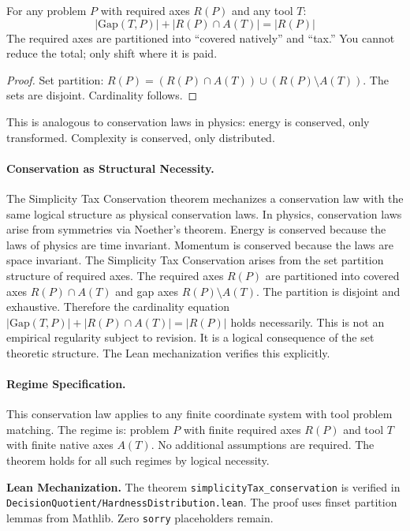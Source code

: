 \begin{theorem}\label{thm:tax-conservation}
For any problem $P$ with required axes $R(P)$ and any tool $T$:
\[|\text{Gap}(T, P)| + |R(P) \cap A(T)| = |R(P)|\]
The required axes are partitioned into ``covered natively'' and ``tax.'' You cannot reduce the total; only shift where it is paid.
\end{theorem}

\begin{proof}
Set partition: $R(P) = (R(P) \cap A(T)) \cup (R(P) \setminus A(T))$. The sets are disjoint. Cardinality follows.
\end{proof}

This is analogous to conservation laws in physics: energy is conserved, only transformed. Complexity is conserved, only distributed.

\paragraph{Conservation as Structural Necessity.}
The Simplicity Tax Conservation theorem mechanizes a conservation law with the same logical structure as physical conservation laws. In physics, conservation laws arise from symmetries via Noether's theorem. Energy is conserved because the laws of physics are time invariant. Momentum is conserved because the laws are space invariant. The Simplicity Tax Conservation arises from the set partition structure of required axes. The required axes $R(P)$ are partitioned into covered axes $R(P) \cap A(T)$ and gap axes $R(P) \setminus A(T)$. The partition is disjoint and exhaustive. Therefore the cardinality equation $|\text{Gap}(T,P)| + |R(P) \cap A(T)| = |R(P)|$ holds necessarily. This is not an empirical regularity subject to revision. It is a logical consequence of the set theoretic structure. The Lean mechanization verifies this explicitly.

\paragraph{Regime Specification.}
This conservation law applies to any finite coordinate system with tool problem matching. The regime is: problem $P$ with finite required axes $R(P)$ and tool $T$ with finite native axes $A(T)$. No additional assumptions are required. The theorem holds for all such regimes by logical necessity.

\textbf{Lean Mechanization.} The theorem \texttt{simplicityTax\_conservation} is verified in \texttt{DecisionQuotient/HardnessDistribution.lean}. The proof uses finset partition lemmas from Mathlib. Zero \texttt{sorry} placeholders remain.

